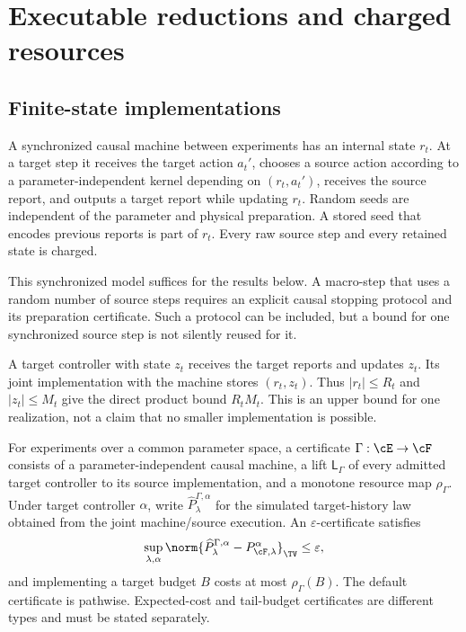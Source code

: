 \section{Executable reductions and charged resources}\label{sec:reductions}
\subsection{Finite-state implementations}
A synchronized causal machine between experiments has an internal state
$r_t$. At a target step it receives the target action $a_t'$, chooses a
source action according to a parameter-independent kernel depending on
$(r_t,a_t')$, receives the source report, and outputs a target report while
updating $r_t$. Random seeds are independent of the parameter and physical
preparation. A stored seed that encodes previous reports is part of $r_t$.
Every raw source step and every retained state is charged.

This synchronized model suffices for the results below. A macro-step that
uses a random number of source steps requires an explicit causal stopping
protocol and its preparation certificate. Such a protocol can be included,
but a bound for one synchronized source step is not silently reused for it.

A target controller with state $z_t$ receives the target reports and updates
$z_t$. Its joint implementation with the machine stores $(r_t,z_t)$. Thus
$|r_t|\le R_t$ and $|z_t|\le M_t$ give the direct product bound $R_tM_t$.
This is an upper bound for one realization, not a claim that no smaller
implementation is possible.

\begin{definition}\label{def:reduction}
For experiments over a common parameter space, a certificate
$\Gamma:\cE\to\cF$ consists of a parameter-independent causal machine,
a lift $\mathsf L_\Gamma$ of every admitted target controller to its source
implementation, and a monotone resource map $\rho_\Gamma$. Under target
controller $\alpha$, write $\widehat P_{\lambda}^{\Gamma,\alpha}$ for
the simulated target-history law obtained from the joint machine/source
execution. An $\varepsilon$-certificate satisfies
\begin{equation}\label{eq:simulation-error}
 \sup_{\lambda,\alpha}
 \norm{\widehat P_{\lambda}^{\Gamma,\alpha}
       -P_{\cF,\lambda}^{\alpha}}_{\TV}\le\varepsilon,
\end{equation}
and implementing a target budget $B$ costs at most $\rho_\Gamma(B)$.
The default certificate is pathwise. Expected-cost and tail-budget
certificates are different types and must be stated separately.
\end{definition}

